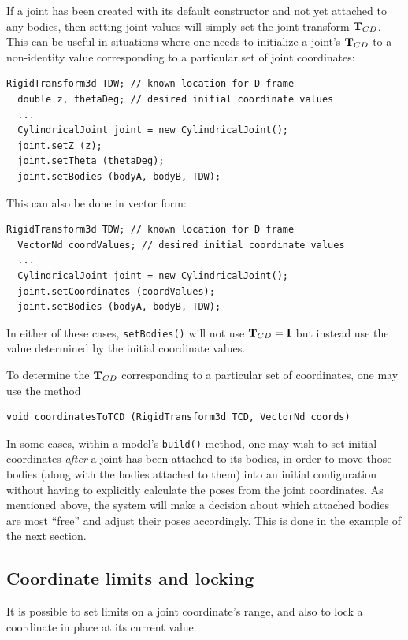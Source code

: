 If a joint has been created with its default constructor and not yet
attached to any bodies, then setting joint values will simply set the
joint transform ${\bf T}_{CD}$. This can be useful in situations where one
needs to initialize a joint's ${\bf T}_{CD}$ to a non-identity value
corresponding to a particular set of joint coordinates:
%
\begin{lstlisting}[]
  RigidTransform3d TDW; // known location for D frame
  double z, thetaDeg; // desired initial coordinate values
  ...
  CylindricalJoint joint = new CylindricalJoint();
  joint.setZ (z);
  joint.setTheta (thetaDeg);
  joint.setBodies (bodyA, bodyB, TDW);
\end{lstlisting}
%
This can also be done in vector form:
%
\begin{lstlisting}[]
  RigidTransform3d TDW; // known location for D frame
  VectorNd coordValues; // desired initial coordinate values
  ...
  CylindricalJoint joint = new CylindricalJoint();
  joint.setCoordinates (coordValues);
  joint.setBodies (bodyA, bodyB, TDW);
\end{lstlisting}
%
In either of these cases, {\tt setBodies()} will not use ${\bf T}_{CD}
= {\bf I}$ but instead use the value determined by the initial coordinate
values.

To determine the ${\bf T}_{CD}$ corresponding to a particular set of
coordinates, one may use the method
\begin{lstlisting}[]
  void coordinatesToTCD (RigidTransform3d TCD, VectorNd coords)
\end{lstlisting}
%

In some cases, within a model's {\tt build()} method, one may wish to
set initial coordinates {\it after} a joint has been attached to its
bodies, in order to move those bodies (along with the bodies attached
to them) into an initial configuration without having to explicitly
calculate the poses from the joint coordinates. As mentioned
above, the system will make a decision about which attached bodies are
most ``free'' and adjust their poses accordingly. This is done in the
example of the next section.

\subsection{Coordinate limits and locking}
\label{coordinateLimitsAndLocking:sec}

It is possible to set limits on a joint coordinate's range, and also
to lock a coordinate in place at its current value.

